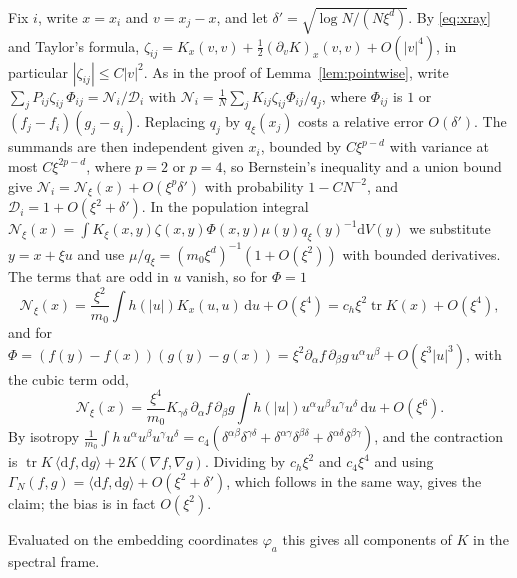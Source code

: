 \documentclass[11pt,a4paper]{article}
\makeatletter
\theoremstyle{stmt}
\theoremstyle{defn}
\theoremstyle{rmk}
\renewenvironment{proof}[1][\proofname]{\par\pushQED{\qed}\normalfont\topsep6\p@\@plus6\p@\relax
  \trivlist\item[\hskip\labelsep{\sffamily\itshape\small #1.}]\ignorespaces}{\popQED\endtrivlist\@endpefalse}
\numberwithin{equation}{section}
\newcommand{\dd}{\mathrm{d}}
\makeatother
\begin{document}
\begin{proof}
Fix $i$, write $x=x_i$ and $v=x_j-x$, and let $\delta'=\sqrt{\log N/(N\xi^d)}$. By \eqref{eq:xray} and Taylor's formula, $\zeta_{ij}=K_x(v,v)+\tfrac12(\partial_vK)_x(v,v)+O(|v|^4)$, in particular $|\zeta_{ij}|\le C|v|^2$. As in the proof of Lemma~\ref{lem:pointwise}, write $\sum_jP_{ij}\zeta_{ij}\,\Phi_{ij}=\mathcal N_i/\mathcal D_i$ with $\mathcal N_i=\frac1N\sum_jK_{ij}\zeta_{ij}\Phi_{ij}/q_j$, where $\Phi_{ij}$ is $1$ or $(f_j-f_i)(g_j-g_i)$. Replacing $q_j$ by $q_\xi(x_j)$ costs a relative error $O(\delta')$. The summands are then independent given $x_i$, bounded by $C\xi^{p-d}$ with variance at most $C\xi^{2p-d}$, where $p=2$ or $p=4$, so Bernstein's inequality and a union bound give $\mathcal N_i=\mathcal N_\xi(x)+O(\xi^p\delta')$ with probability $1-CN^{-2}$, and $\mathcal D_i=1+O(\xi^2+\delta')$. In the population integral $\mathcal N_\xi(x)=\int K_\xi(x,y)\zeta(x,y)\Phi(x,y)\mu(y)q_\xi(y)^{-1}\dd V(y)$ we substitute $y=x+\xi u$ and use $\mu/q_\xi=(m_0\xi^d)^{-1}(1+O(\xi^2))$ with bounded derivatives. The terms that are odd in $u$ vanish, so for $\Phi=1$
\[
\mathcal N_\xi(x)=\frac{\xi^2}{m_0}\int h(|u|)K_x(u,u)\,\dd u+O(\xi^4)=c_h\xi^2\operatorname{tr}K(x)+O(\xi^4),
\]
and for $\Phi=(f(y)-f(x))(g(y)-g(x))=\xi^2\partial_\alpha f\,\partial_\beta g\,u^\alpha u^\beta+O(\xi^3|u|^3)$, with the cubic term odd,
\[
\mathcal N_\xi(x)=\frac{\xi^4}{m_0}K_{\gamma\delta}\,\partial_\alpha f\,\partial_\beta g\int h(|u|)u^\alpha u^\beta u^\gamma u^\delta\,\dd u+O(\xi^6).
\]
By isotropy $\tfrac1{m_0}\int h\,u^\alpha u^\beta u^\gamma u^\delta=c_4(\delta^{\alpha\beta}\delta^{\gamma\delta}+\delta^{\alpha\gamma}\delta^{\beta\delta}+\delta^{\alpha\delta}\delta^{\beta\gamma})$, and the contraction is $\operatorname{tr}K\,\langle\dd f,\dd g\rangle+2K(\nabla f,\nabla g)$. Dividing by $c_h\xi^2$ and $c_4\xi^4$ and using $\Gamma_N(f,g)=\langle\dd f,\dd g\rangle+O(\xi^2+\delta')$, which follows in the same way, gives the claim; the bias is in fact $O(\xi^2)$.
\end{proof}

Evaluated on the embedding coordinates $\varphi_a$ this gives all components of $K$ in the spectral frame.
\end{document}
